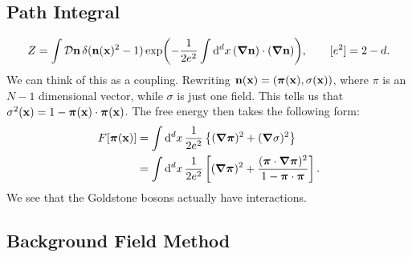 \subsection*{Path Integral}%

\begin{equation}
  Z = \int \mathop{\mathcal{D} \vb{n}} \delta(\vb{n}(\vb{x})^2 - 1) \exp(-\frac{1}{2e^2} \int \dd[d]{x} (\grad \vb{n}) \cdot (\grad \vb{n})), \qquad [e^2] = 2 - d.
\end{equation}
We can think of this as a coupling.
Rewriting $\vb{n}(\vb{x}) = (\boldsymbol\pi(\vb{x}), \sigma(\vb{x}))$, where $\pi$ is an $N-1$ dimensional vector, while $\sigma$ is just one field.
This tells us that $\sigma^2(\vb{x}) = 1 - \boldsymbol\pi(\vb{x}) \cdot \boldsymbol\pi(\vb{x})$.
The free energy then takes the following form:
\begin{align}
  F[\boldsymbol\pi(\vb{x})] &= \int \dd[d]{x} \frac{1}{2e^2} \left\{ (\grad \boldsymbol\pi)^2 + (\grad \sigma)^2 \right\} \\
			    &= \int \dd[d]{x} \frac{1}{2e^2} \left[ (\grad \boldsymbol\pi)^2 + \frac{(\boldsymbol\pi \cdot \grad \boldsymbol\pi)^2}{1 - \boldsymbol\pi \cdot \boldsymbol\pi} \right].
\end{align}
We see that the Goldstone bosons actually have interactions.

\subsection*{Background Field Method}%

